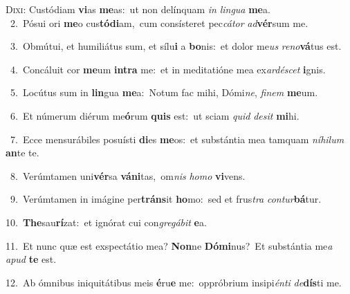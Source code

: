 \lettrine{\initial\textcolor{\initialcolor}{D}}{ixi:} Custódiam \textbf{vi}\-as \textbf{me}\-as:~\star ut non delínquam \textit{in} \textit{lin}\-\textit{gua} \textbf{me}\-a.\\
{\numbfont\textcolor{\numbcolor}{~2.}}~Pósui ori \textbf{me}\-o cus\-\textbf{tó}\-\textbf{di}am,~\star cum consísteret pec\-\textit{cá}\-\textit{tor} \textit{ad}\-\textbf{vér}sum me.\par
{\numbfont\textcolor{\numbcolor}{~3.}}~Obmútui, et humiliátus sum, et sílu\textbf{i} a \textbf{bo}\-nis:~\star et dolor me\textit{us} \textit{re}\-\textit{no}\textbf{vá}tus est.\par
{\numbfont\textcolor{\numbcolor}{~4.}}~Concáluit cor \textbf{me}\-um \textbf{in}\-\textbf{tra} me:~\star et in meditatióne mea ex\-\textit{ar}\-\textit{dé}\textit{scet} \textbf{i}\-gnis.\par
{\numbfont\textcolor{\numbcolor}{~5.}}~Locútus sum in \textbf{lin}\-gua \textbf{me}\-a:~\star Notum fac mihi, Dómi\-\textit{ne}\-, \textit{fi}\-\textit{nem} \textbf{me}\-um.\par
{\numbfont\textcolor{\numbcolor}{~6.}}~Et númerum diérum me\-\textbf{ó}\-rum \textbf{quis} est:~\star ut sciam \textit{quid} \textit{de}\-\textit{sit} \textbf{mi}\-hi.\par
{\numbfont\textcolor{\numbcolor}{~7.}}~Ecce mensurábiles posuísti \textbf{di}\-es \textbf{me}\-os:~\star et substántia mea tamquam \textit{ní}\-\textit{hi}\textit{lum} \textbf{an}\-te te.\par
{\numbfont\textcolor{\numbcolor}{~8.}}~Verúmtamen uni\-\textbf{vér}\-sa \textbf{vá}\-\textbf{ni}tas,~\star om\textit{nis} \textit{ho}\-\textit{mo} \textbf{vi}\-vens.\par
{\numbfont\textcolor{\numbcolor}{~9.}}~Verúmtamen in imágine per\-\textbf{tráns}\-it \textbf{ho}\-mo:~\star sed et frus\textit{tra} \textit{con}\-\textit{tur}\textbf{bá}tur.\par
{\numbfont\textcolor{\numbcolor}{10.}}~\-\textbf{The}\-sau\-\textbf{rí}\-zat:~\star et ignórat cui con\-\textit{gre}\-\textit{gá}\textit{bit} \textbf{e}\-a.\par
{\numbfont\textcolor{\numbcolor}{11.}}~Et nunc quæ est exspectátio mea? \textbf{Non}\-ne \textbf{Dó}\-\textbf{mi}nus?~\star Et substántia me\textit{a} \textit{a}\-\textit{pud} \textbf{te} est.\par
{\numbfont\textcolor{\numbcolor}{12.}}~Ab ómnibus iniquitátibus meis \textbf{é}\-ru\textbf{e} me:~\star oppróbrium insipi\-\textit{én}\-\textit{ti} \textit{de}\-\textbf{dís}ti me.\par
